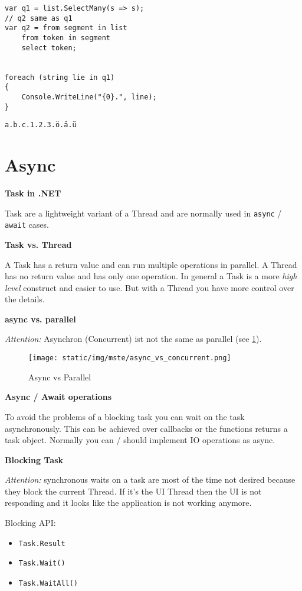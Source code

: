 \documentclass[11pt,twoside,landscape]{article}
\begin{document}
\begin{multicols}{3}
\begin{lstlisting}
var q1 = list.SelectMany(s => s);
// q2 same as q1
var q2 = from segment in list
    from token in segment
    select token;


foreach (string lie in q1)
{
    Console.WriteLine("{0}.", line);
}
\end{lstlisting}
\begin{verbatim}
a.b.c.1.2.3.ö.ä.ü
\end{verbatim}

\section{Async}
\label{sec:orgff9e1a3}
\textbf{Task in .NET}

Task are a lightweight variant of a Thread and are normally used in \texttt{async} / \texttt{await} cases.

\textbf{Task vs. Thread}

A Task has a return value and can run multiple operations in parallel.
A Thread has no return value and has only one operation.
In general a Task is a more \emph{high level} construct and easier to use.
But with a Thread you have more control over the details.

\textbf{async vs. parallel}

\emph{Attention:} Asynchron (Concurrent) ist not the same as parallel (see \ref{fig:orgf15659f}).

\begin{figure}[htbp]
\centering
\texttt{[image: static/img/mste/async\_vs\_concurrent.png]}
\caption{\label{fig:orgf15659f}Async vs Parallel}
\end{figure}

\textbf{Async / Await operations}

To avoid the problems of a blocking task you can wait on the task asynchronously.
This can be achieved over callbacks or the functions returns a task object.
Normally you can / should implement IO operations as async.

\textbf{Blocking Task}

\emph{Attention:} synchronous waits on a task are most of the time not desired because they block the current Thread.
If it's the UI Thread then the UI is not responding and it looks like the application is not working anymore.


Blocking API:
\begin{itemize}
\item \texttt{Task.Result}
\item \texttt{Task.Wait()}
\item \texttt{Task.WaitAll()}
\end{itemize}



\end{multicols}
\end{document}
